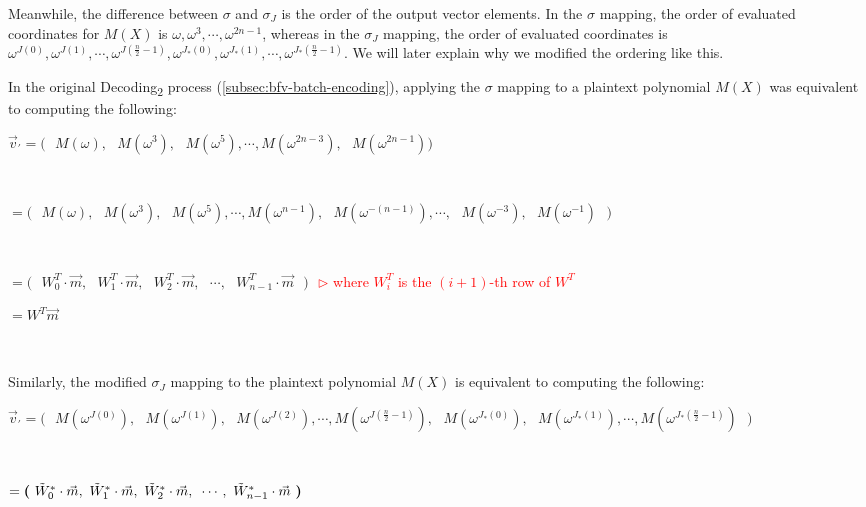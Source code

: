 Meanwhile, the difference between $\sigma$ and $\sigma_J$ is the order of the output vector elements. In the $\sigma$ mapping, the order of evaluated coordinates for $M(X)$ is $\omega, \omega^3, \cdots, \omega^{2n - 1}$, whereas in the $\sigma_J$ mapping, the order of evaluated coordinates is $\omega^{J(0)}, \omega^{J(1)}, \cdots, \omega^{J(\frac{n}{2} - 1)}, \omega^{J_*(0)}, \omega^{J_*(1)}, \cdots, \omega^{J_*(\frac{n}{2} - 1)}$. We will later explain why we modified the ordering like this. 

In the original \textsf{Decoding\textsubscript{2}} process (\autoref{subsec:bfv-batch-encoding}), applying the $\sigma$ mapping to a plaintext polynomial $M(X)$ was equivalent to computing the following: 

$\vec{v}_{'} = \bm{(} \text{ } M(\omega), \text{ } M(\omega^3), \text{ } M(\omega^5), \cdots, M(\omega^{2n-3}), \text{ } M(\omega^{2n-1}) \bm{)}$ 

$ $

$ = \bm{(} \text{ } M(\omega), \text{ } M(\omega^3), \text{ } M(\omega^5), \cdots, M(\omega^{n-1}), \text{ } M(\omega^{-(n-1)}), \cdots, \text{ } M(\omega^{-3}), \text{ } M(\omega^{-1}) \text{ } \bm{)}$ 

$ $

$= \bm{(} \text{ } W^T_0\cdot \vec{m}, \text{ } W^T_1\cdot \vec{m}, \text{ } W^T_2\cdot \vec{m}, \text{ } \cdots, \text{ } W^T_{n-1}\cdot \vec{m} \text{ } \bm{)} $ 
$ $ \textcolor{red}{ $\rhd$ where $W_i^T$ is the $(i+1)$-th row of $W^T$}

$ = W^T \vec{m} $




$ $

Similarly, the modified $\sigma_J$ mapping to the plaintext polynomial $M(X)$ is equivalent to computing the following:

$\vec{v}_{'} =  \bm{(} \text{ } 
M(\omega^{J(0)}), \text{ } M(\omega^{J(1)}), \text{ } M(\omega^{J(2)}), \cdots,  M(\omega^{J(\frac{n}{2}-1)}), \text{ } M(\omega^{J_*(0)}), \text{ } M(\omega^{J_*(1)}), \cdots,  M(\omega^{J_*(\frac{n}{2}-1)}) \text{ } \bm{)}$


$ $

$= \bm{(} \text{ } \tilde{W}^*_0\cdot \vec{m}, \text{ } \tilde{W}^*_1\cdot \vec{m}, \text{ } \tilde{W}^*_2\cdot \vec{m}, \text{ } \cdots, \text{ } \tilde{W}^*_{n-1}\cdot \vec{m} \text{ } \bm{)} $ 

